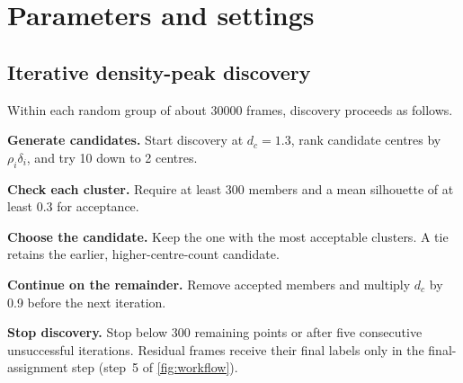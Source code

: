\chapter{Parameters and settings}
\label{app:parameters}
\section*{Iterative density-peak discovery}
Within each random group of about \num{30000} frames, discovery proceeds as follows.
\begin{protocolsteps}
\item \textbf{Generate candidates.} Start discovery at $d_c=1.3$, rank candidate centres by $\rho_i\delta_i$, and try 10 down to 2 centres.
\item \textbf{Check each cluster.} Require at least 300 members and a mean silhouette of at least 0.3 for acceptance.
\item \textbf{Choose the candidate.} Keep the one with the most acceptable clusters. A tie retains the earlier, higher-centre-count candidate.
\item \textbf{Continue on the remainder.} Remove accepted members and multiply $d_c$ by 0.9 before the next iteration.
\item \textbf{Stop discovery.} Stop below 300 remaining points or after five consecutive unsuccessful iterations. Residual frames receive their final labels only in the final-assignment step (step~5 of \cref{fig:workflow}).
\end{protocolsteps}

